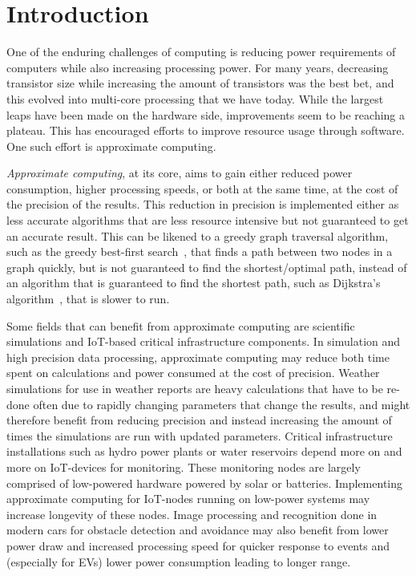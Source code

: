 \section{Introduction}

One of the enduring challenges of computing is reducing power requirements of computers while also increasing processing power. For many years, decreasing transistor size while increasing the amount of transistors was the best bet, and this evolved into multi-core processing that we have today. While the largest leaps have been made on the hardware side, improvements seem to be reaching a plateau. This has encouraged efforts to improve resource usage through software. One such effort is approximate computing. 

\emph{Approximate computing}, at its core, aims to gain either reduced power consumption, higher processing speeds, or both at the same time, at the cost of the precision of the results. This reduction in precision is implemented either as less accurate algorithms that are less resource intensive but not guaranteed to get an accurate result. This can be likened to a greedy graph traversal algorithm, such as the greedy best-first search~\citep{coles2007marvin}, that finds a path between two nodes in a graph quickly, but is not guaranteed to find the shortest/optimal path, instead of an algorithm that is guaranteed to find the shortest path, such as Dijkstra's algorithm~\citep{dijkstra1959note}, that is slower to run.

Some fields that can benefit from approximate computing are scientific simulations and IoT-based critical infrastructure components. In simulation and high precision data processing, approximate computing may reduce both time spent on calculations and power consumed at the cost of precision. Weather simulations for use in weather reports are heavy calculations that have to be re-done often due to rapidly changing parameters that change the results, and might therefore benefit from reducing precision and instead increasing the amount of times the simulations are run with updated parameters. Critical infrastructure installations such as hydro power plants or water reservoirs depend more on and more on IoT-devices for monitoring. These monitoring nodes are largely comprised of low-powered hardware powered by solar or batteries. Implementing approximate computing for IoT-nodes running on low-power systems may increase longevity of these nodes. Image processing and recognition done in modern cars for obstacle detection and avoidance may also benefit from lower power draw and increased processing speed for quicker response to events and (especially for EVs) lower power consumption leading to longer range. %

